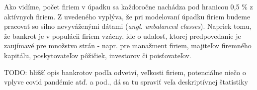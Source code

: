 Ako vidíme, počet firiem v úpadku sa každoročne nachádza pod hranicou 0,5 \% z aktívnych firiem.
Z uvedeného vyplýva, že pri modelovaní úpadku firiem budeme pracovať so silno nevyváženými dátami (\emph{angl. unbalanced classes}).
Napriek tomu, že bankrot je v populácii firiem vzácny, ide o udalosť, ktorej predpovedanie je zaujímavé pre množstvo strán -
napr. pre manažment firiem, majiteľov firemného kapitálu, poskytovateľov pôžičiek, investorov či poisťovateľov.

TODO: bližší opis bankrotov podľa odvetví, veľkosti firiem, potenciálne niečo o vplyve covid pandémie atď. a pod.,
dá sa tu spraviť veľa deskriptívnej štatistiky